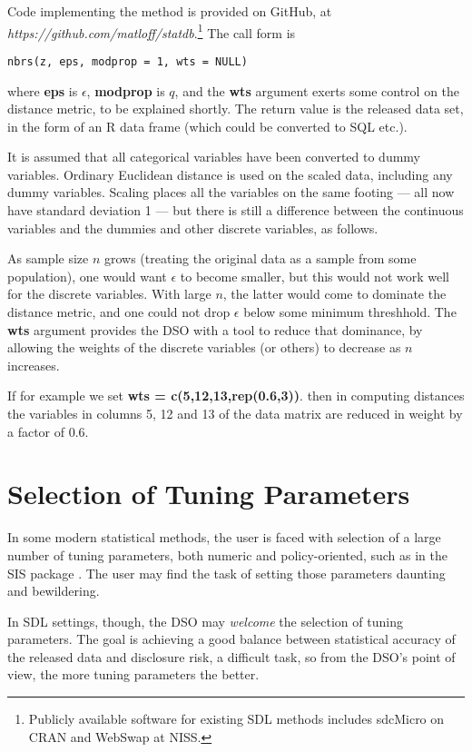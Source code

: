 \documentclass[11pt]{article}
\begin{document}
Code implementing the method is provided on GitHub, at {\it
https://github.com/matloff/statdb}.\footnote{Publicly available software 
for existing SDL methods includes sdcMicro on CRAN and WebSwap at NISS. }  
The call form is

\begin{lstlisting}
nbrs(z, eps, modprop = 1, wts = NULL) 
\end{lstlisting}

where {\bf eps} is $\epsilon$, {\bf modprop} is $q$, and the {\bf wts}
argument exerts some control on the distance metric, to be explained
shortly.  The return value is the released data set, in the form of an R
data frame (which could be converted to SQL etc.).

It is assumed that all categorical variables have been converted to
dummy variables.  Ordinary Euclidean distance is used on the scaled
data, including any dummy variables.  Scaling places all the variables
on the same footing --- all now have standard deviation 1 --- but there
is still a difference between the continuous variables and the dummies
and other discrete variables, as follows.

As sample size $n$ grows (treating the original data as a sample from
some population), one would want $\epsilon$ to become smaller, but this
would not work well for the discrete variables.  With large $n$, the
latter would come to dominate the distance metric, and one could not
drop $\epsilon$ below some minimum threshhold.  The {\bf wts}
argument provides the DSO with a tool to reduce that dominance, by
allowing the weights of the discrete variables (or others) to decrease
as $n$ increases.

If for example we set {\bf wts = c(5,12,13,rep(0.6,3))}. then in
computing distances the variables in columns 5, 12 and 13 of the data
matrix are reduced in weight by a factor of 0.6.  

\section{Selection of Tuning Parameters}

In some modern statistical methods, the user is faced with selection of
a large number of tuning parameters, both numeric and policy-oriented,
such as in the SIS package \cite{fan}.  The user may find the task of
setting those parameters daunting and bewildering.

In SDL settings, though, the DSO may {\it welcome} the selection of
tuning parameters. The goal is achieving a good balance between
statistical accuracy of the released data and disclosure risk, a
difficult task, so from the DSO's point of view, the more tuning
parameters the better.
\end{document}
